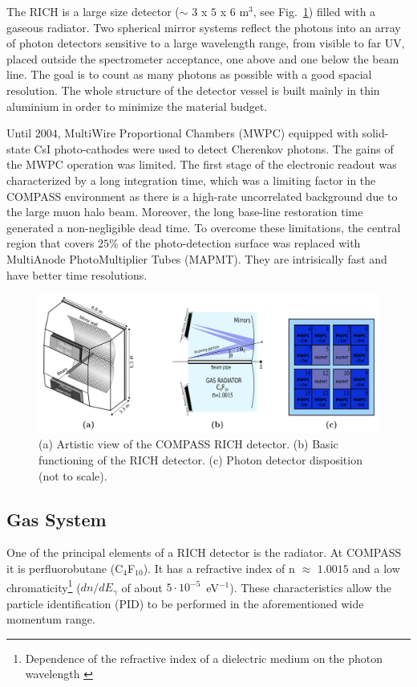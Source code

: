 The RICH is a large size detector ($\sim$ $3$ x $5$ x $6$ m$^3$, see Fig.~\ref{pic:RICHview}) filled with a gaseous radiator. Two spherical mirror systems reflect the photons into an array of photon detectors sensitive to a large wavelength range, from visible to far UV, placed outside the spectrometer acceptance, one above and one below the beam line. The goal is to count as many photons as possible with a good spacial resolution. The whole structure of the detector vessel is built mainly in thin aluminium in order to minimize the material budget.

Until $2004$, MultiWire Proportional Chambers (MWPC) equipped with solid-state CsI photo-cathodes were used to detect Cherenkov photons. The gains of the MWPC operation was limited. The first stage of the electronic readout was characterized by a long integration time, which was a limiting factor in the COMPASS environment as there is a high-rate uncorrelated background due to the large muon halo beam. Moreover, the long base-line restoration time generated a non-negligible dead time. To overcome these limitations, the central region that covers $25$\% of the photo-detection surface was replaced with MultiAnode PhotoMultiplier Tubes (MAPMT). They are intrisically fast and have better time resolutions.

\begin{figure}[!h]
  \centering
	\includegraphics[scale=0.4]{./gfx/RICHview.png}
	\caption{(a) Artistic view of the COMPASS RICH detector. (b) Basic functioning of the RICH detector. (c) Photon detector disposition (not to scale).}
	\label{pic:RICHview}
\end{figure}

\subsection{Gas System}

One of the principal elements of a RICH detector is the radiator. At COMPASS it is perfluorobutane (C$_4$F$_{10}$). It has a refractive index of n $\approx$ $1.0015$ and a low chromaticity\footnote{Dependence of the refractive index of a dielectric medium on the photon wavelength \cite{Dispersion}} ($dn/dE_{\gamma}$ of about $5 \cdot 10^{-5}$~eV$^{-1}$). These characteristics allow the particle identification (PID) to be performed in the aforementioned wide momentum range.

